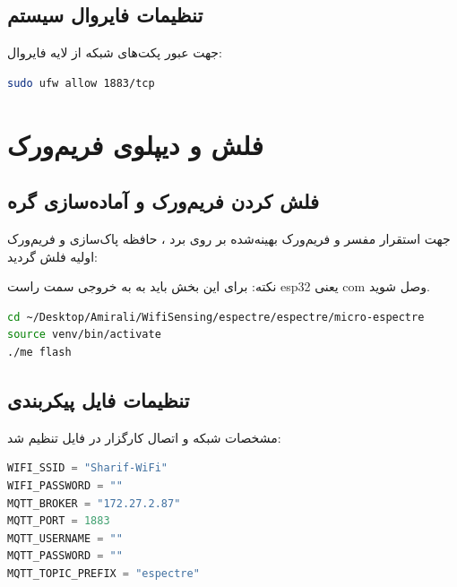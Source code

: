 \documentclass[12pt,a4paper]{article}
\begin{document}
\subsection{تنظیمات فایروال سیستم}
جهت عبور پکت‌های شبکه از لایه فایروال:

\begin{latin}
\begin{lstlisting}[language=bash]
sudo ufw allow 1883/tcp
\end{lstlisting}
\EndAccSupp{}
\end{latin}

\section{فلش و دیپلوی فریم‌ورک }

\subsection{فلش کردن فریم‌ورک و آماده‌سازی گره}
جهت استقرار مفسر و فریم‌ورک بهینه‌شده  بر روی برد ، حافظه پاک‌سازی و فریم‌ورک اولیه فلش گردید:

نکته: برای این بخش باید به به خروجی سمت راست esp32 یعنی com وصل شوید.

\begin{latin}
\begin{lstlisting}[language=bash]
cd ~/Desktop/Amirali/WifiSensing/espectre/espectre/micro-espectre
source venv/bin/activate
./me flash
\end{lstlisting}
\EndAccSupp{}
\end{latin}

\subsection{تنظیمات فایل پیکربندی}
مشخصات شبکه و اتصال کارگزار در فایل  تنظیم شد:
\begin{latin}
\begin{lstlisting}[language=python]
WIFI_SSID = "Sharif-WiFi"
WIFI_PASSWORD = ""
MQTT_BROKER = "172.27.2.87"
MQTT_PORT = 1883
MQTT_USERNAME = ""
MQTT_PASSWORD = ""
MQTT_TOPIC_PREFIX = "espectre"
\end{lstlisting}
\EndAccSupp{}
\end{latin}
\end{document}
